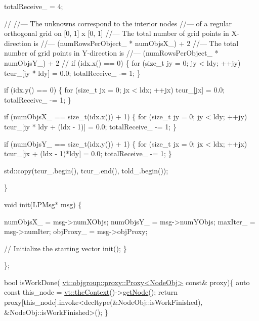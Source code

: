 \begin{DoxyCodeInclude}
    totalReceive\_ = 4;

    \textcolor{comment}{//}
    \textcolor{comment}{//--- The unknowns correspond to the interior nodes}
    \textcolor{comment}{//--- of a regular orthogonal grid on [0, 1] x [0, 1]}
    \textcolor{comment}{//--- The total number of grid points in X-direction is}
    \textcolor{comment}{//--- (numRowsPerObject\_ * numObjsX\_) + 2}
    \textcolor{comment}{//--- The total number of grid points in Y-direction is}
    \textcolor{comment}{//--- (numRowsPerObject\_ * numObjsY\_) + 2}
    \textcolor{comment}{//}
    \textcolor{keywordflow}{if} (idx.x() == 0) \{
      \textcolor{keywordflow}{for} (\textcolor{keywordtype}{size\_t} jy = 0; jy < ldy; ++jy)
        tcur\_[jy * ldy] = 0.0;
      totalReceive\_ -= 1;
    \}

    \textcolor{keywordflow}{if} (idx.y() == 0) \{
      \textcolor{keywordflow}{for} (\textcolor{keywordtype}{size\_t} jx = 0; jx < ldx; ++jx)
        tcur\_[jx] = 0.0;
      totalReceive\_ -= 1;
    \}

    \textcolor{keywordflow}{if} (numObjsX\_ == \textcolor{keywordtype}{size\_t}(idx.x()) + 1) \{
      \textcolor{keywordflow}{for} (\textcolor{keywordtype}{size\_t} jy = 0; jy < ldy; ++jy)
        tcur\_[jy * ldy + (ldx - 1)] = 0.0;
      totalReceive\_ -= 1;
    \}

    \textcolor{keywordflow}{if} (numObjsY\_ == \textcolor{keywordtype}{size\_t}(idx.y()) + 1) \{
      \textcolor{keywordflow}{for} (\textcolor{keywordtype}{size\_t} jx = 0; jx < ldx; ++jx)
        tcur\_[jx + (ldx - 1)*ldy] = 0.0;
      totalReceive\_ -= 1;
    \}

    std::copy(tcur\_.begin(), tcur\_.end(), told\_.begin());

  \}


  \textcolor{keywordtype}{void} init(LPMsg* msg) \{

    numObjsX\_ = msg->numXObjs;
    numObjsY\_ = msg->numYObjs;
    maxIter\_ = msg->numIter;
    objProxy\_ = msg->objProxy;

    \textcolor{comment}{// Initialize the starting vector}
    init();
  \}

\};

\textcolor{keywordtype}{bool} isWorkDone( \hyperlink{structvt_1_1objgroup_1_1proxy_1_1_proxy}{vt::objgroup::proxy::Proxy<NodeObj>} \textcolor{keyword}{const}& proxy)\{
  \textcolor{keyword}{auto} \textcolor{keyword}{const} this\_node = \hyperlink{namespacevt_a26551fe0e6e6a1371111df5b12c7e92c}{vt::theContext}()->\hyperlink{structvt_1_1ctx_1_1_context_a0d52c263ce8516546a67443d9a86fa5f}{getNode}();
  \textcolor{keywordflow}{return} proxy[this\_node].invoke<decltype(&NodeObj::isWorkFinished), &NodeObj::isWorkFinished>();
\}


\end{DoxyCodeInclude}
